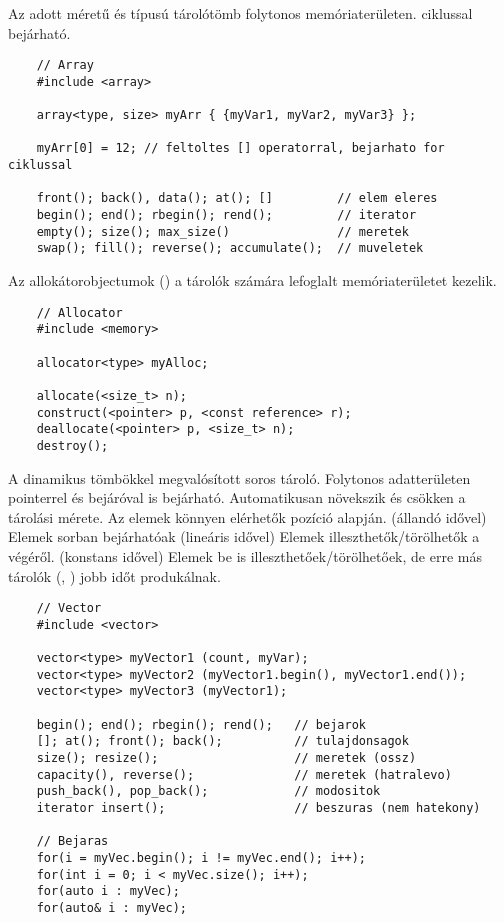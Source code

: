 \documentclass[main.tex]{subfiles}
\begin{document}
  
  Az  adott méretű és típusú tárolótömb
  folytonos memóriaterületen.  ciklussal bejárható.
  \begin{lstlisting}
    // Array
    #include <array>

    array<type, size> myArr { {myVar1, myVar2, myVar3} };

    myArr[0] = 12; // feltoltes [] operatorral, bejarhato for ciklussal

    front(); back(), data(); at(); []         // elem eleres
    begin(); end(); rbegin(); rend();         // iterator
    empty(); size(); max_size()               // meretek
    swap(); fill(); reverse(); accumulate();  // muveletek
  \end{lstlisting}

  Az allokátorobjectumok () a tárolók számára
  lefoglalt memóriaterületet kezelik.
  \begin{lstlisting}
    // Allocator
    #include <memory>

    allocator<type> myAlloc;

    allocate(<size_t> n);
    construct(<pointer> p, <const reference> r);
    deallocate(<pointer> p, <size_t> n);
    destroy();
  \end{lstlisting}

  A  dinamikus tömbökkel megvalósított soros tároló.
  Folytonos adatterületen pointerrel és bejáróval is bejárható.
  Automatikusan növekszik és csökken a tárolási mérete.
  Az elemek könnyen elérhetők pozíció alapján. (állandó idővel)
  Elemek sorban bejárhatóak (lineáris idővel)
  Elemek illeszthetők/törölhetők a végéről. (konstans idővel)
  Elemek be is illeszthetőek/törölhetőek, de erre más tárolók
  (, ) jobb időt produkálnak.
  \begin{lstlisting}
    // Vector
    #include <vector>

    vector<type> myVector1 (count, myVar);
    vector<type> myVector2 (myVector1.begin(), myVector1.end());
    vector<type> myVector3 (myVector1);

    begin(); end(); rbegin(); rend();   // bejarok
    []; at(); front(); back();          // tulajdonsagok
    size(); resize();                   // meretek (ossz)
    capacity(), reverse();              // meretek (hatralevo)
    push_back(), pop_back();            // modositok
    iterator insert();                  // beszuras (nem hatekony)

    // Bejaras
    for(i = myVec.begin(); i != myVec.end(); i++);
    for(int i = 0; i < myVec.size(); i++);
    for(auto i : myVec);
    for(auto& i : myVec);
  \end{lstlisting}
\end{document}
